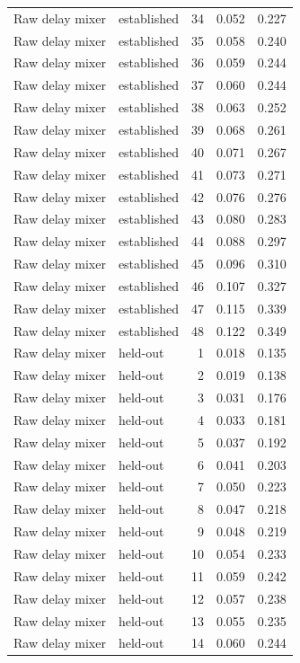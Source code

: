 \begin{tabular}{llrrr}
Raw delay mixer & established & 34 & 0.052 & 0.227 \\
Raw delay mixer & established & 35 & 0.058 & 0.240 \\
Raw delay mixer & established & 36 & 0.059 & 0.244 \\
Raw delay mixer & established & 37 & 0.060 & 0.244 \\
Raw delay mixer & established & 38 & 0.063 & 0.252 \\
Raw delay mixer & established & 39 & 0.068 & 0.261 \\
Raw delay mixer & established & 40 & 0.071 & 0.267 \\
Raw delay mixer & established & 41 & 0.073 & 0.271 \\
Raw delay mixer & established & 42 & 0.076 & 0.276 \\
Raw delay mixer & established & 43 & 0.080 & 0.283 \\
Raw delay mixer & established & 44 & 0.088 & 0.297 \\
Raw delay mixer & established & 45 & 0.096 & 0.310 \\
Raw delay mixer & established & 46 & 0.107 & 0.327 \\
Raw delay mixer & established & 47 & 0.115 & 0.339 \\
Raw delay mixer & established & 48 & 0.122 & 0.349 \\
Raw delay mixer & held-out & 1 & 0.018 & 0.135 \\
Raw delay mixer & held-out & 2 & 0.019 & 0.138 \\
Raw delay mixer & held-out & 3 & 0.031 & 0.176 \\
Raw delay mixer & held-out & 4 & 0.033 & 0.181 \\
Raw delay mixer & held-out & 5 & 0.037 & 0.192 \\
Raw delay mixer & held-out & 6 & 0.041 & 0.203 \\
Raw delay mixer & held-out & 7 & 0.050 & 0.223 \\
Raw delay mixer & held-out & 8 & 0.047 & 0.218 \\
Raw delay mixer & held-out & 9 & 0.048 & 0.219 \\
Raw delay mixer & held-out & 10 & 0.054 & 0.233 \\
Raw delay mixer & held-out & 11 & 0.059 & 0.242 \\
Raw delay mixer & held-out & 12 & 0.057 & 0.238 \\
Raw delay mixer & held-out & 13 & 0.055 & 0.235 \\
Raw delay mixer & held-out & 14 & 0.060 & 0.244 \\

\end{tabular}
